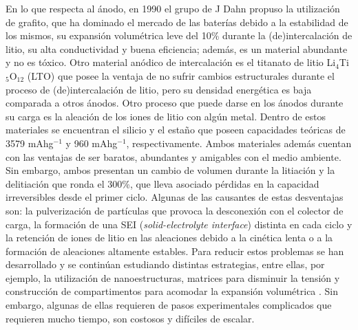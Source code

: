 En lo que respecta al ánodo, en 1990 el grupo de J Dahn \cite{fong1990} propuso 
la utilización de grafito, que ha dominado el mercado de las baterías debido a
la estabilidad de los mismos, su expansión volumétrica leve del 10\% durante 
la (de)intercalación de litio, su alta conductividad y buena eficiencia; además, 
es un material abundante y no es tóxico. Otro material anódico de intercalación 
es el titanato de litio Li$_4$Ti$_5$O$_{12}$ (LTO) que posee la ventaja de 
no sufrir cambios estructurales durante el proceso de (de)intercalación de litio, 
pero su densidad energética es baja comparada a otros ánodos. Otro proceso que
puede darse en los ánodos durante su carga es la aleación de los iones de litio 
con algún metal. Dentro de estos materiales se encuentran el silicio y el estaño
que poseen capacidades teóricas de 3579 mAhg$^{-1}$ y 960 mAhg$^{-1}$, 
respectivamente. Ambos materiales además cuentan con las ventajas de ser baratos,
abundantes y amigables con el medio ambiente. Sin embargo, ambos presentan un 
cambio de volumen durante la litiación y la delitiación que ronda el 300\%, que 
lleva asociado pérdidas en la capacidad irreversibles desde el primer ciclo.
Algunas de las causantes de estas desventajas son: la pulverización de 
partículas que provoca la desconexión con el colector de carga, la formación de 
una SEI (\textit{solid-electrolyte interface}) distinta en cada ciclo y la 
retención de iones de litio en las aleaciones debido a la cinética lenta o a la
formación de aleaciones altamente estables. Para reducir estos problemas se 
han desarrollado y se continúan estudiando distintas estrategias, entre ellas,
por ejemplo, la utilización de nanoestructuras, matrices para disminuir la 
tensión y construcción de compartimentos para acomodar la expansión 
volumétrica \cite{zuo2016}. Sin embargo, algunas de ellas requieren de pasos 
experimentales complicados que requieren mucho tiempo, son costosos y difíciles
de escalar.

